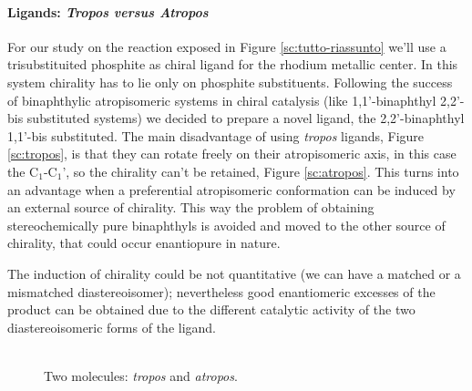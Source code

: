 \paragraph{Ligands: \emph{Tropos versus Atropos}}
For our study on the reaction exposed in Figure \ref{sc:tutto-riassunto} we'll use a trisubstituited phosphite as chiral ligand for the rhodium metallic center. In this system chirality has to lie only on phosphite substituents. Following the success of bi\-naphthylic atrop\-isomeric systems in chiral catalysis (like 1,1'-bi\-naphthyl 2,2'-bis substituted systems) we decided to prepare a novel ligand, the 2,2'-bi\-naphthyl 1,1'-bis substituted.
The main disadvantage of using \emph{tropos} ligands, Figure \ref{sc:tropos}, is that they can rotate freely on their atrop\-isomeric axis, in this case the C$_1$-C$_1$', so the chirality can't be retained, Figure \ref{sc:atropos}. This turns into an advantage when a preferential atrop\-isomeric conformation can be induced by an external source of chirality. This way the problem of obtaining stereo\-chemically pure bi\-naphthyls is avoided and moved to the other source of chirality, that could occur enantiopure in nature.

The induction of chirality could be not %
 quantitative (we can have a matched or a mismatched diastereoisomer); %
nevertheless good enantiomeric excesses of the product can be obtained due to the different catalytic activity of the two diastereoisomeric forms of the ligand.

\ifpdf
\begin{figure}
 \centering
  \qquad%
\caption{\\Two molecules: \emph{tropos} and \emph{atropos}.}
\end{figure}
\else
\fignoeps
\fi

